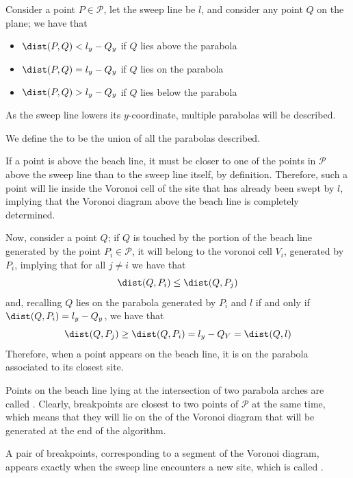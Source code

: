 \documentclass[a4paper, 12pt]{report}
\begin{document}

    Consider a point $P \in \mathcal P$, let the sweep line be $l$, and consider any point $Q$ on the plane; we have that

    \begin{itemize}
        \item $\dist(P, Q) < l_y - Q_y$ if $Q$ lies above the parabola
        \item $\dist(P, Q) = l_y - Q_y$ if $Q$ lies on the parabola
        \item $\dist(P, Q) > l_y - Q_y$ if $Q$ lies below the parabola
    \end{itemize}

    As the sweep line lowers its $y$-coordinate, multiple parabolas will be described.


    We define the  to be the union of all the parabolas described.


    If a point is above the beach line, it must be closer to one of the points in $\mathcal P$ above the sweep line than to the sweep line itself, by definition. Therefore, such a point will lie inside the Voronoi cell of the site that has already been swept by $l$, implying that the Voronoi diagram above the beach line is completely determined.

    Now, consider a point $Q$; if $Q$ is touched by the portion of the beach line generated by the point $P_i \in \mathcal P$, it will belong to the voronoi cell $V_i$, generated by $P_i$, implying that for all $j \neq i$ we have that $$\dist(Q, P_i) \le \dist(Q, P_j)$$ and, recalling $Q$ lies on the parabola generated by $P_i$ and $l$ if and only if $\dist(Q, P_i) = l_y - Q_y$, we have that $$\dist(Q, P_j) \ge \dist(Q, P_i) = l_y - Q_Y = \dist(Q, l)$$ Therefore, when a point appears on the beach line, it is on the parabola associated to its closest site.

    Points on the beach line lying at the intersection of two parabola arches are called . Clearly, breakpoints are closest to two points of $\mathcal P$ at the same time, which means that they will lie on the  of the Voronoi diagram that will be generated at the end of the algorithm.

    A pair of breakpoints, corresponding to a segment of the Voronoi diagram, appears exactly when the sweep line encounters a new site, which is called .
\end{document}
